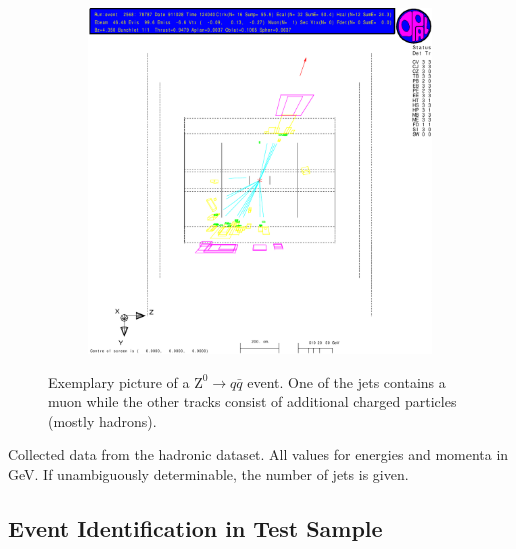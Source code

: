 \documentclass[11pt, a4paper]{article}
\numberwithin{equation}{section}
\begin{document}
\begin{figure}[h]
	\ContinuedFloat
	\begin{subfigure}{\textwidth}
		\centering
		\includegraphics[width=.9\textwidth]{./data/tag1/qq_pics/cropped/qq_04_side}
	\end{subfigure}
	\caption{Exemplary picture of a $\mathrm{Z}^0\rightarrow q\bar{q}$ event. One of the jets contains a muon while the other tracks consist of additional charged particles (mostly hadrons).}
	\label{fig:eventdisplay_qq}
\end{figure}
\begin{table}
	\centering
	
	\caption{Collected data from the hadronic dataset. All values for energies and momenta in \si{GeV}. If unambiguously determinable, the number of jets is given.}
	\label{tab:eventdisplay_qq}
\end{table}
\clearpage

\subsection{Event Identification in Test Sample}
\end{document}
